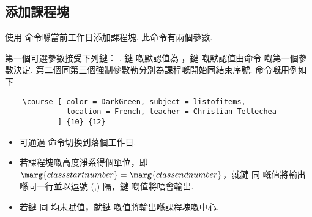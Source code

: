 \documentclass[letterpaper]{l3doc}
\newenvironment{example}{\begin{list}{}{\leftmargin=3em}\item }{\end{list}}
\begin{document}
\subsection{添加課程塊}

使用  命令喺當前工作日添加課程塊. 此命令有兩個參數.

\begin{example}
\end{example}

第一個可選參數接受下列鍵：    . 鍵  嘅默認值為 ，鍵  嘅默認值由命令  嘅第一個參數決定. 第二個同第三個強制參數勒分別為課程嘅開始同結束序號.  命令嘅用例如下

\begin{Verbatim}
    \course [ color = DarkGreen, subject = listofitems, 
              location = French, teacher = Christian Tellechea
            ] {10} {12}
\end{Verbatim}

\begin{center}
    \noindent{}
\end{center}

\begin{itemize}
    \item 可通過  命令切換到落個工作日.
    \item 若課程塊嘅高度淨系得個單位，即$\marg{class start number} = \marg{class end number}$，就鍵  同  嘅值將輸出喺同一行並以逗號 (,) 隔，鍵  嘅值將唔會輸出.
    \item 若鍵  同  均未賦值，就鍵  嘅值將輸出喺課程塊嘅中心.
\end{itemize}


\end{document}

